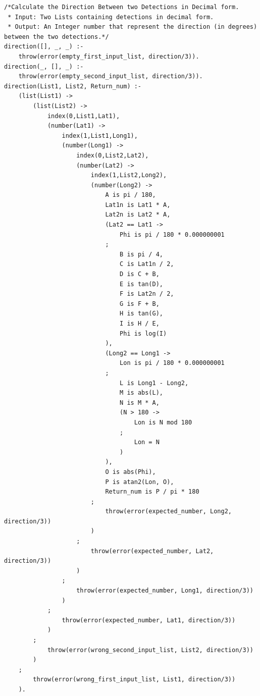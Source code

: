 \documentclass{article}
\begin{document}
\begin{lstlisting}
/*Calculate the Direction Between two Detections in Decimal form.
 * Input: Two Lists containing detections in decimal form.
 * Output: An Integer number that represent the direction (in degrees) between the two detections.*/
direction([], _, _) :-
    throw(error(empty_first_input_list, direction/3)).
direction(_, [], _) :-
    throw(error(empty_second_input_list, direction/3)).
direction(List1, List2, Return_num) :-
    (list(List1) -> 
        (list(List2) -> 
            index(0,List1,Lat1),
            (number(Lat1) -> 
                index(1,List1,Long1),
                (number(Long1) -> 
                    index(0,List2,Lat2),
                    (number(Lat2) -> 
                        index(1,List2,Long2),
                        (number(Long2) -> 
                            A is pi / 180,
                            Lat1n is Lat1 * A,
                            Lat2n is Lat2 * A,
                            (Lat2 == Lat1 -> 
                                Phi is pi / 180 * 0.000000001
                            ;
                                B is pi / 4,
                                C is Lat1n / 2,
                                D is C + B,
                                E is tan(D),
                                F is Lat2n / 2,
                                G is F + B,
                                H is tan(G),
                                I is H / E,
                                Phi is log(I)
                            ),
                            (Long2 == Long1 ->
                                Lon is pi / 180 * 0.000000001
                            ;
                                L is Long1 - Long2,
                                M is abs(L), 
                                N is M * A,
                                (N > 180 -> 
                                    Lon is N mod 180
                                ;
                                    Lon = N
                                )
                            ),
                            O is abs(Phi),
                            P is atan2(Lon, O),
                            Return_num is P / pi * 180
                        ;
                            throw(error(expected_number, Long2, direction/3))
                        )
                    ;
                        throw(error(expected_number, Lat2, direction/3))
                    )
                ;
                    throw(error(expected_number, Long1, direction/3))
                )
            ;
                throw(error(expected_number, Lat1, direction/3))
            )
        ;
            throw(error(wrong_second_input_list, List2, direction/3))
        )
    ;
        throw(error(wrong_first_input_list, List1, direction/3))
    ).
    

\end{lstlisting}
\end{document}
